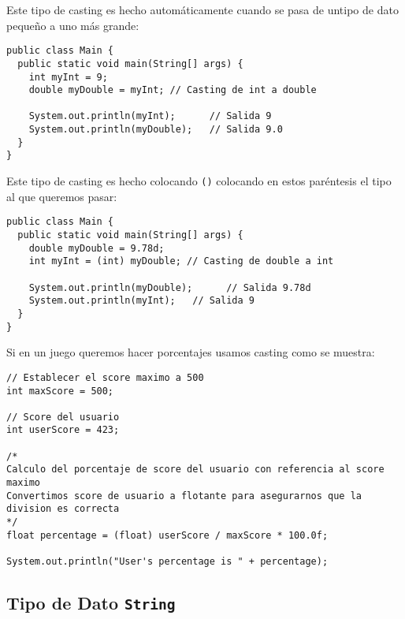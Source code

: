 \documentclass[12pt]{article}
\theoremstyle{largebreak}
\begin{document}
    \begin{exa}
        Este tipo de casting es hecho automáticamente cuando se pasa de untipo de dato pequeño a uno más grande:
        \begin{lstlisting}[caption={Casting a más.},label=DescriptiveLabel]
public class Main {
  public static void main(String[] args) {
    int myInt = 9;
    double myDouble = myInt; // Casting de int a double

    System.out.println(myInt);      // Salida 9
    System.out.println(myDouble);   // Salida 9.0
  }
}
        \end{lstlisting}
    \end{exa}

    \begin{exa}
        Este tipo de casting es hecho colocando \lstinline|()| colocando en estos paréntesis el tipo al que queremos pasar:
        \begin{lstlisting}[caption={Casting a menos.},label=DescriptiveLabel]
public class Main {
  public static void main(String[] args) {
    double myDouble = 9.78d;
    int myInt = (int) myDouble; // Casting de double a int

    System.out.println(myDouble);      // Salida 9.78d
    System.out.println(myInt);   // Salida 9
  }
}
        \end{lstlisting}
    \end{exa}

    \begin{exa}
        Si en un juego queremos hacer porcentajes usamos casting como se muestra:
        \begin{lstlisting}[caption={Ejemplo Casting en Score.},label=DescriptiveLabel]
// Establecer el score maximo a 500
int maxScore = 500;

// Score del usuario
int userScore = 423;

/*
Calculo del porcentaje de score del usuario con referencia al score maximo
Convertimos score de usuario a flotante para asegurarnos que la division es correcta
*/
float percentage = (float) userScore / maxScore * 100.0f;

System.out.println("User's percentage is " + percentage);
        \end{lstlisting}
    \end{exa}

    \subsection{Tipo de Dato \lstinline|String|}
\end{document}

